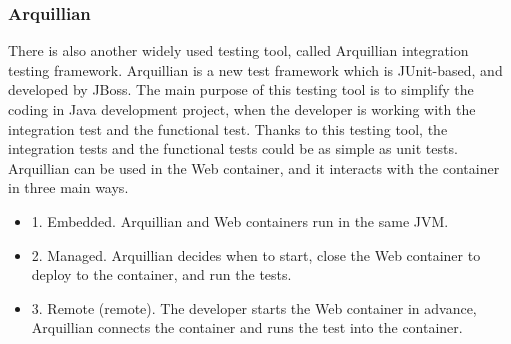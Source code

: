 \documentclass{article}
\begin{document}
	\subsubsection{Arquillian}
	There is also another widely used testing tool, called Arquillian integration testing framework.
	Arquillian is a new test framework which is JUnit-based, and developed by JBoss. The main purpose of this testing tool is to simplify the coding in Java development project, when the developer is working with the integration test and the functional test. Thanks to this testing tool, the integration tests and the functional tests could be as simple as unit tests. Arquillian can be used in the Web container, and it interacts with the container in three main ways.
		\begin{itemize}
			\item 1. Embedded. Arquillian and Web containers run in the same JVM.
			\item 2. Managed. Arquillian decides when to start, close the Web container to deploy to the container, and run the tests.
			\item 3. Remote (remote). The developer starts the Web container in advance, Arquillian connects the container and runs the test into the container.
		\end{itemize}
	
\end{document}

